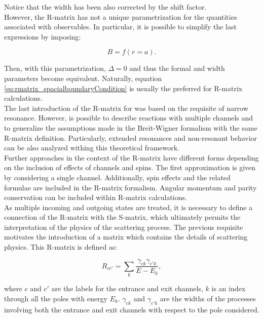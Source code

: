 \documentclass[openany]{book}
\begin{document}
Notice that the width has been also corrected by the shift factor. \\

However, the R-matrix has not a unique parametrization for the quantities associated with observables. In particular, it is possible to simplify the last expressions by imposing: 

\begin{equation}  \label{eq:rmatrix_spacialboundaryCondition}
	B = f(r = a). 
\end{equation}

Then, with this parametrization, $\Delta = 0$ and thus the formal and width parameters become equivalent. Naturally, equation \ref{eq:rmatrix_spacialboundaryCondition} is usually  the preferred for R-matrix calculations. \\

The last introduction of the R-matrix for was based on the requisite of narrow resonance. However,  is possible to describe reactions with multiple channels and to generalize the assumptions made in the Breit-Wigner formalism with the same R-matrix definition. Particularly, extended resonances and non-resonant behavior can be also analyzed withing this theoretical framework.\\

Further approaches in the context of the R-matrix have different forms depending on the inclusion of effects of channels and spins. The first approximation is given by considering a single channel. Additionally, spin effects and the related formulae are included in the R-matrix formalism. Angular momentum and parity conservation can be included within R-matrix calculations. \\

As multiple incoming and outgoing states are treated, it is necessary to define a connection of the R-matrix with the S-matrix, which ultimately permits the interpretation of the physics of the scattering process. The previous requisite motivates the introduction of a matrix which contains the details of scattering physics. This R-matrix is defined as:

\begin{equation}  \label{eq:rmatrix_elements}
	R_{cc'} = \sum_k {\frac{\gamma_{ck} \gamma_{c'k}}{E - E_k}}, 
\end{equation}

where $c$ and $c'$ are the labels for the entrance and exit channels, $k$ is an index through all the poles with energy $E_k$. $\gamma_{ck}$ and $\gamma_{c'k}$ are the widths of the processes involving both the entrance and exit channels with respect to the pole considered. \\
\end{document}
